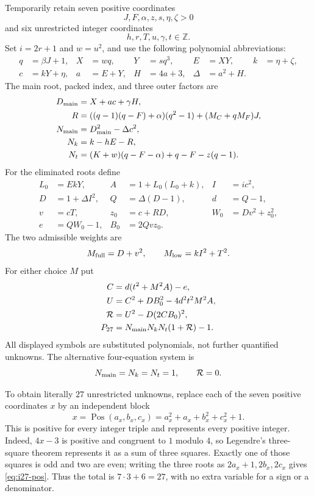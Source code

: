 Temporarily retain seven positive coordinates
\[
 J,F,\alpha,z,s,\eta,\zeta>0
\]
and six unrestricted integer coordinates
\[
 h,r,T,u,\gamma,t\in\mathbb Z.
\]
Set $i=2r+1$ and $w=u^2$, and use the following polynomial abbreviations:
\begin{align*}
 q&=\beta J+1,& X&=wq,& Y&=sq^3,& E&=XY,& k&=\eta+\zeta,\\
 c&=kY+\eta,& a&=E+Y,& H&=4a+3,& \Delta&=a^2+H.
\end{align*}
The main root, packed index, and three outer factors are
\begin{align*}
 D_{\rm main}&=X+ac+\gamma H,\\
 R&=((q-1)(q-F)+\alpha)(q^2-1)+(M_C+qM_F)J,\\
 N_{\rm main}&=D_{\rm main}^2-\Delta c^2,\\
 N_k&=k-hE-R,\\
 N_t&=(K+w)(q-F-\alpha)+q-F-z(q-1).
\end{align*}
For the eliminated roots define
\begin{align*}
 L_0&=EkY,& A&=1+L_0(L_0+k),& I&=ic^2,\\
 D&=1+\Delta I^2,& Q&=\Delta(D-1),& d&=Q-1,\\
 v&=cT,& z_0&=c+RD,& W_0&=Dv^2+z_0^2,\\
 e&=QW_0-1,& B_0&=2Qvz_0.
\end{align*}
The two admissible weights are
\[
 M_{\rm full}=D+v^2,
 \qquad M_{\rm low}=kI^2+T^2.
\]
For either choice $M$ put
\begin{align}
 C&=d(t^2+M^2A)-e,\nonumber\\
 U&=C^2+DB_0^2-4d^2t^2M^2A,\nonumber\\
 \mathcal R&=U^2-D(2CB_0)^2,\label{eq:i27-resultant}\\
 P_{27}&=N_{\rm main}N_kN_t(1+\mathcal R)-1.
 \label{eq:i27-polynomial}
\end{align}
All displayed symbols are substituted polynomials, not further quantified
unknowns. The alternative four-equation system is
\begin{equation}
 N_{\rm main}=N_k=N_t=1,\qquad \mathcal R=0.
 \label{eq:i27-system}
\end{equation}

To obtain literally $27$ unrestricted unknowns, replace each of the seven
positive coordinates $x$ by an independent block
\begin{equation}
 x=\operatorname{Pos}(a_x,b_x,c_x)
   =a_x^2+a_x+b_x^2+c_x^2+1.
 \label{eq:i27-pos}
\end{equation}
This is positive for every integer triple and represents every positive
integer. Indeed, $4x-3$ is positive and congruent to $1$ modulo $4$, so
Legendre's three-square theorem represents it as a sum of three squares.
Exactly one of those squares is odd and two are even; writing the three
roots as $2a_x+1,2b_x,2c_x$ gives \eqref{eq:i27-pos}. Thus the total is
$7\cdot3+6=27$, with no extra variable for a sign or a denominator.

